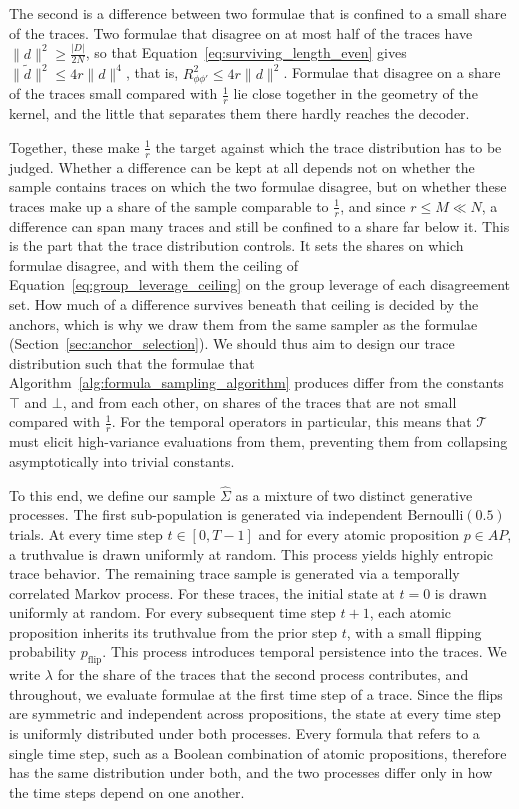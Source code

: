 \documentclass[titlepage,a4paper,11pt]{report}
\begin{document}
    The second is a difference between two formulae that is confined to a small share of the traces. Two formulae that disagree on at most half of the traces have $\lVert d\rVert^2\ge \frac{|D|}{2N}$, so that Equation~\eqref{eq:surviving_length_even} gives $\lVert\tilde d\rVert^2\le4r\lVert d\rVert^4$, that is, $R^2_{\phi\phi'}\le4r\lVert d\rVert^2$. Formulae that disagree on a share of the traces small compared with $\frac1r$ lie close together in the geometry of the kernel, and the little that separates them there hardly reaches the decoder.
 
    Together, these make $\frac1r$ the target against which the trace distribution has to be judged. Whether a difference can be kept at all depends not on whether the sample contains traces on which the two formulae disagree, but on whether these traces make up a share of the sample comparable to $\frac1r$, and since $r\le M\ll N$, a difference can span many traces and still be confined to a share far below it. This is the part that the trace distribution controls. It sets the shares on which formulae disagree, and with them the ceiling of Equation~\eqref{eq:group_leverage_ceiling} on the group leverage of each disagreement set. How much of a difference survives beneath that ceiling is decided by the anchors, which is why we draw them from the same sampler as the formulae (Section~\ref{sec:anchor_selection}). We should thus aim to design our trace distribution such that the formulae that Algorithm~\ref{alg:formula_sampling_algorithm} produces differ from the constants $\top$ and $\bot$, and from each other, on shares of the traces that are not small compared with $\frac1r$. For the temporal operators in particular, this means that $\mathcal{T}$ must elicit high-variance evaluations from them, preventing them from collapsing asymptotically into trivial constants.
 
    To this end, we define our sample $\widehat\Sigma$ as a mixture of two distinct generative processes. The first sub-population is generated via independent Bernoulli$(0.5)$ trials. At every time step $t \in [0, T-1]$ and for every atomic proposition $p \in AP$, a truthvalue is drawn uniformly at random. This process yields highly entropic trace behavior. The remaining trace sample is generated via a temporally correlated Markov process. For these traces, the initial state at $t=0$ is drawn uniformly at random. For every subsequent time step $t+1$, each atomic proposition inherits its truthvalue from the prior step $t$, with a small flipping probability $p_{\text{flip}}$. This process introduces temporal persistence into the traces. We write $\lambda$ for the share of the traces that the second process contributes, and throughout, we evaluate formulae at the first time step of a trace. Since the flips are symmetric and independent across propositions, the state at every time step is uniformly distributed under both processes. Every formula that refers to a single time step, such as a Boolean combination of atomic propositions, therefore has the same distribution under both, and the two processes differ only in how the time steps depend on one another.
    
\end{document}
